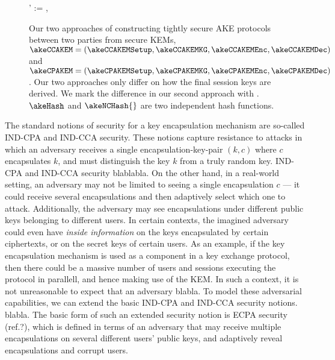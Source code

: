 \begin{figure}[t]
\begin{pcimage}
{{				\<\akeCPAkey' := \akeCPAkey,  
			}
		}
	\end{pcimage}
	\caption{Our two approaches of constructing tightly secure AKE protocols between two parties from  secure KEMs, $\akeCCAKEM = (\akeCCAKEMSetup, \akeCCAKEMKG, \akeCCAKEMEnc, \akeCCAKEMDec)$ and $\akeCPAKEM = (\akeCPAKEMSetup, \akeCPAKEMKG, \akeCPAKEMEnc, \akeCPAKEMDec)$. Our two approaches only differ on how the final session keys are derived. We mark the difference in our second approach with . $\akeHash$ and $\akeNCHash{}$ are two independent hash functions.}
	\label{fig:scheme:vis-akescheme}
\end{figure}
\fi


The standard notions of security for a key encapsulation mechanism are so-called IND-CPA and IND-CCA security.
These notions capture resistance to attacks in which an adversary receives a single
encapsulation-key-pair \((k,c)\) where \(c\) encapsulates \(k\),
and must distinguish the key \(k\) from a truly random key.
IND-CPA and IND-CCA security blablabla.
On the other hand, in a real-world setting,
an adversary may not be limited to seeing a single encapsulation \(c\)
--- it could receive several encapsulations and then adaptively select which one to attack.
Additionally, the adversary may see encapsulations under different public keys belonging to different users.
In certain contexts, the imagined adversary could even have \emph{inside information}
on the keys encapsulated by certain ciphertexts, or on the secret keys of certain users.
As an example, if the key encapsulation mechanism is used as a component in a key exchange protocol,
then there could be a massive number of users and sessions executing the protocol in parallell,
and hence making use of the KEM.
In such a context, it is not unreasonable to expect that an adversary blabla.
To model these adversarial capabilities,
we can extend the basic IND-CPA and IND-CCA security notions.
blabla.
The basic form of such an extended security notion is ECPA security (ref.?),
which is defined in terms of an adversary that may receive multiple encapsulations
on several different users' public keys, and adaptively reveal encapsulations and corrupt users.


